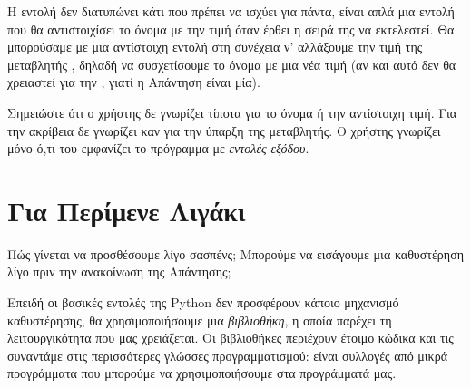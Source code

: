 \documentclass[a4paper,11pt,oneside]{book}
\begin{document}

Η εντολή  δεν διατυπώνει κάτι που πρέπει να ισχύει για πάντα, είναι απλά μια εντολή που θα αντιστοιχίσει το όνομα  με την τιμή  όταν έρθει η σειρά της να εκτελεστεί. Θα μπορούσαμε με μια αντίστοιχη εντολή στη συνέχεια ν' αλλάξουμε την τιμή της μεταβλητής , δηλαδή να συσχετίσουμε το όνομα με μια νέα τιμή (αν και αυτό δεν θα χρειαστεί για την , γιατί η Απάντηση είναι μία). 

Σημειώστε ότι ο χρήστης δε γνωρίζει τίποτα για το όνομα  ή την αντίστοιχη τιμή. Για την ακρίβεια δε γνωρίζει καν για την ύπαρξη της μεταβλητής. Ο χρήστης γνωρίζει μόνο ό,τι του εμφανίζει το πρόγραμμα με \emph{εντολές εξόδου}. 


\section{Για Περίμενε Λιγάκι}

\begin{question}
Πώς γίνεται να προσθέσουμε λίγο σασπένς; Μπορούμε να εισάγουμε μια καθυστέρηση λίγο πριν την ανακοίνωση της Απάντησης;
\end{question}

Επειδή οι βασικές εντολές της Python δεν προσφέρουν κάποιο μηχανισμό καθυστέρησης, θα χρησιμοποιήσουμε μια \emph{βιβλιοθήκη}, η οποία παρέχει τη λειτουργικότητα που μας χρειάζεται. 
Οι βιβλιοθήκες περιέχουν έτοιμο κώδικα και τις συναντάμε στις περισσότερες γλώσσες προγραμματισμού: είναι συλλογές από μικρά προγράμματα που μπορούμε να χρησιμοποιήσουμε στα προγράμματά μας.

\end{document}
